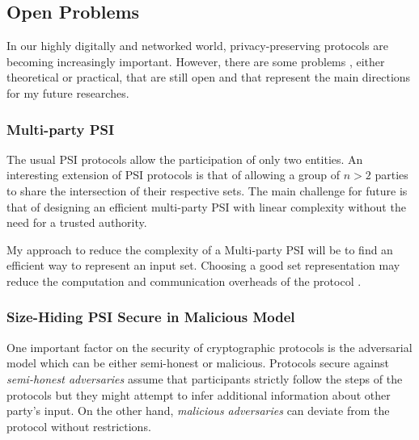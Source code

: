 \documentclass[dvips,12pt]{article}
\begin{document}

\subsection{Open Problems}
In our highly digitally and networked world, privacy-preserving protocols are becoming increasingly important. 
However, there are some problems \cite{dissertation}, either theoretical or practical, that are still open and that represent the main directions for my future researches.
\subsubsection{Multi-party PSI}
The usual PSI protocols allow the participation of only two entities. 
An interesting extension of PSI protocols is that of allowing a group of $n > 2$ parties to share the intersection of their respective sets. The main challenge for future is that of designing an efficient multi-party PSI with linear complexity without the need for a trusted authority.

My approach to reduce the complexity of a Multi-party PSI will be to find an efficient way to represent an input set. Choosing a good set representation may reduce the computation and communication overheads of the protocol \cite{quasi-linear}. 

\subsubsection{Size-Hiding PSI Secure in Malicious Model}
One important factor on the security of cryptographic protocols is the adversarial model which can be either semi-honest or malicious. 
Protocols secure against \emph{semi-honest adversaries} assume that participants strictly follow the steps of the protocols but they might attempt to infer additional information about other party's input. On the other hand, \emph{malicious adversaries} can deviate from the protocol without restrictions.
\end{document}

